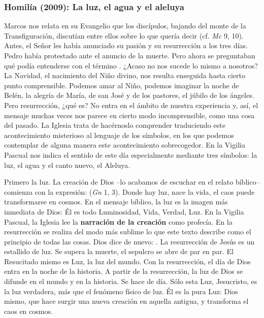 \newpage 

\subsubsection{Homilía (2009): La luz, el agua y el aleluya}


\begin{body}
 Marcos nos relata en su Evangelio que los discípulos, bajando del monte de la Transfiguración, discutían entre ellos sobre lo que quería decir  (cf. \textit{Mc} 9, 10). Antes, el Señor les había anunciado su pasión y su resurrección a los tres días. Pedro había protestado ante el anuncio de la muerte. Pero ahora se preguntaban qué podía entenderse con el término . ¿Acaso no nos sucede lo mismo a nosotros? La Navidad, el nacimiento del Niño divino, nos resulta enseguida hasta cierto punto comprensible. Podemos amar al Niño, podemos imaginar la noche de Belén, la alegría de María, de san José y de los pastores, el júbilo de los ángeles. Pero resurrección, ¿qué es? No entra en el ámbito de nuestra experiencia y, así, el mensaje muchas veces nos parece en cierto modo incomprensible, como una cosa del pasado. La Iglesia trata de hacérnoslo comprender traduciendo este acontecimiento misterioso al lenguaje de los símbolos, en los que podemos contemplar de alguna manera este acontecimiento sobrecogedor. En la Vigilia Pascual nos indica el sentido de este día especialmente mediante tres símbolos: la luz, el agua y el canto nuevo, el Aleluya.

Primero la luz. La creación de Dios –lo acabamos de escuchar en el relato bíblico– comienza con la expresión:  (\textit{Gn} 1, 3). Donde hay luz, nace la vida, el caos puede transformarse en cosmos. En el mensaje bíblico, la luz es la imagen más inmediata de Dios: Él es todo Luminosidad, Vida, Verdad, Luz. En la Vigilia Pascual, la Iglesia lee la \textbf{narración de la creación} como profecía. En la resurrección se realiza del modo más sublime lo que este texto describe como el principio de todas las cosas. Dios dice de nuevo: . La resurrección de Jesús es un estallido de luz. Se supera la muerte, el sepulcro se abre de par en par. El Resucitado mismo es Luz, la luz del mundo. Con la resurrección, el día de Dios entra en la noche de la historia. A partir de la resurrección, la luz de Dios se difunde en el mundo y en la historia. Se hace de día. Sólo esta Luz, Jesucristo, es la luz verdadera, más que el fenómeno físico de luz. Él es la pura Luz: Dios mismo, que hace surgir una nueva creación en aquella antigua, y transforma el caos en cosmos.


\end{body}
